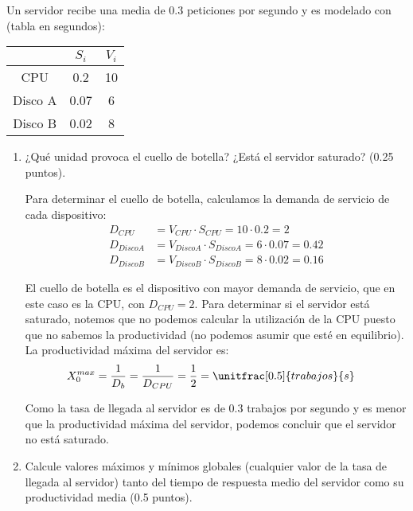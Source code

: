 \documentclass[12pt]{article}
\begin{document}
    \begin{ejercicio}[2 puntos]
        Un servidor recibe una media de $0.3$ peticiones por segundo y es modelado con (tabla en segundos):
        \begin{table}[H]
        \centering
        \begin{tabular}{c|c|c}
            & $S_i$ & $V_i$ \\
            \hline
            CPU & 0.2 & 10 \\
            Disco A & 0.07 & 6 \\
            Disco B & 0.02 & 8
        \end{tabular}
        \end{table}

        \begin{enumerate}
            \item ¿Qué unidad provoca el cuello de botella? ¿Está el servidor saturado? (0.25 puntos).
            
            Para determinar el cuello de botella, calculamos la demanda de servicio de cada dispositivo:
            \begin{align*}
                D_{CPU} &= V_{CPU}\cdot S_{CPU} = 10\cdot 0.2 = 2\\
                D_{Disco A} &= V_{Disco A}\cdot S_{Disco A} = 6\cdot 0.07 = 0.42\\
                D_{Disco B} &= V_{Disco B}\cdot S_{Disco B} = 8\cdot 0.02 = 0.16
            \end{align*}

            El cuello de botella es el dispositivo con mayor demanda de servicio, que en este caso es la CPU, con $D_{CPU} = 2$.
            Para determinar si el servidor está saturado, notemos que no podemos calcular la utilización de la CPU puesto que no sabemos la productividad (no podemos asumir que esté en equilibrio).
            La productividad máxima del servidor es:
            \begin{align*}
                X_0^{max} &= \frac{1}{D_b} = \frac{1}{D_{CPU}} = \frac{1}{2} = \unitfrac[0.5]{trabajos}{s}
            \end{align*}

            Como la tasa de llegada al servidor es de $0.3$ trabajos por segundo y es menor que la productividad máxima del servidor, podemos concluir que el servidor no está saturado.
            \item Calcule valores máximos y mínimos globales (cualquier valor de la tasa de llegada al servidor) tanto del tiempo de respuesta medio del servidor como su productividad media (0.5 puntos).
            

\end{enumerate}
\end{ejercicio}
\end{document}
